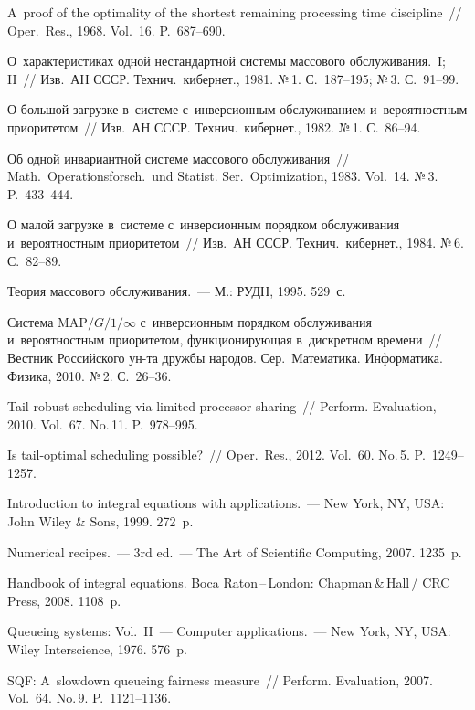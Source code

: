 \begin{multicols}{2}
{{\begin{thebibliography}{99}
 A~proof of the optimality of the shortest remaining processing
time discipline~// Oper.\ Res., 1968. Vol.~16. P.~687--690.



О~характеристиках одной нестандартной системы
массового обслуживания.~I; II~// Изв.\ АН СССР. Технич.\ кибернет., 1981.
№\,1. С.~187--195; №\,3. С.~91--99.

О большой загрузке в~системе с~инверсионным
обслуживанием и~вероятностным приоритетом~//
Изв.\ АН СССР. Технич.\ кибернет., 1982. №\,1. С.~86--94.

 Об одной
инвариантной системе массового обслуживания~//
Math.\ Operationsforsch.\ und Statist. Ser.\ Optimization, 1983. Vol.~14. №\,3. P.~433--444.



О малой загрузке в~сис\-те\-ме с~инверсионным порядком
обслуживания и~вероятностным приоритетом~//
Изв.\ АН СССР. Технич.\ кибернет., 1984. №\,6. С.~82--89.

Теория массового обслуживания.~--- М.: РУДН, 1995. 529~с.

Система MAP$/G/1/\infty$ с~инверсионным порядком
обслуживания и~вероятностным приоритетом,
функционирующая в~дискретном времени~//
Вестник Российского ун-та дружбы народов.
Сер.\ Математика. Информатика. Физика, 2010. №\,2. С.~26--36.

 Tail-robust scheduling via limited processor sharing~// Perform. Evaluation, 2010. Vol.~67. No.\,11. P.~978--995.

 Is tail-optimal scheduling possible?~//
Oper.\ Res., 2012. Vol.~60. No.\,5. P.~1249--1257.

Introduction to integral equations with applications.~---
New York, NY, USA: John Wiley \& Sons, 1999. 272~p.

Numerical recipes.~--- 3rd ed.~--- The Art of Scientific Computing, 2007.
1235~p.


Handbook of integral equations.
 Boca Raton\,--\,London: Chapman\,\&\,Hall\,/ CRC Press, 2008. 1108~p.


 Queueing systems: Vol.~II~--- Computer applications.~---
New York, NY, USA: Wiley Interscience, 1976. 576~p.

SQF: A~slowdown queueing fairness measure~//
Perform. Evaluation, 2007. Vol.~64. No.\,9. P.~1121--1136.
 \end{thebibliography}

 }
 }

\end{multicols}

